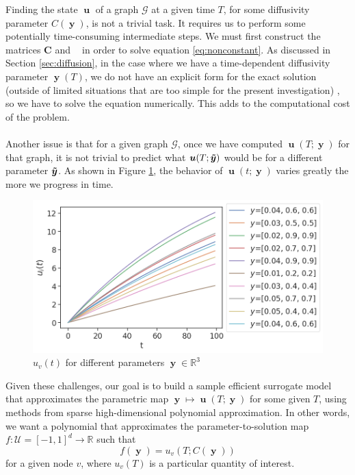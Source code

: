 \documentclass[12pt, oneside]{report}   	%
\newcommand{\R}{\mathbb{R}}
\DeclareMathOperator{\DC}{\boldsymbol{D}(\boldsymbol{C})}
\DeclareMathOperator{\uu}{\boldsymbol{u}}
\DeclareMathOperator{\y}{\boldsymbol{y}}
\DeclareMathOperator{\ytilde}{\boldsymbol{\Tilde{y}}}
\begin{document}
\noindent Finding the state $\uu$ of a graph $\mathcal{G}$ at a given time $T$, for some diffusivity parameter $C(\y)$, is not a trivial task. It requires us to perform some potentially time-consuming intermediate steps. We must first construct the matrices $\boldsymbol{C}$ and $\DC$ in order to solve equation \eqref{eq:nonconstant}. As discussed in Section \ref{sec:diffusion}, in the case where we have a time-dependent diffusivity parameter $\y(T)$, we do not have an explicit form for the exact solution (outside of limited situations that are too simple for the present investigation) \cite{floquet1883equations}, so we have to solve the equation numerically. This adds to the computational cost of the problem.\\\\
Another issue is that for a given graph $\mathcal{G}$, once we have computed $\uu(T;\y)$ for that graph, it is not trivial to predict what $\uu(T;\ytilde)$ would be for a different parameter $\ytilde$.  As shown in Figure \ref{fig:cmsimg}, the behavior of $\uu(t;\y)$ varies greatly the more we progress in time.
\begin{figure}[t]
    \centering
    \includegraphics[scale=0.5]{graf8c.png}
    \caption{$u_v(t)$ for different parameters $\y\in\R^3$}
    \label{fig:cmsimg}
\end{figure}

\noindent Given these challenges, our goal is to build a sample efficient surrogate model that approximates the parametric map $\y\mapsto\uu(T;\y)$ for some given $T$, using methods from sparse high-dimensional polynomial approximation. In other words, we want a polynomial that approximates the parameter-to-solution map $f:\mathcal{U}=[-1,1]^d\to\R$ such that 
\begin{equation}
\label{eq:goal}
f(\y)=u_v(T;C(\y))
\end{equation}
for a given node $v$, where $u_v(T)$ is a particular quantity of interest.
\end{document}
